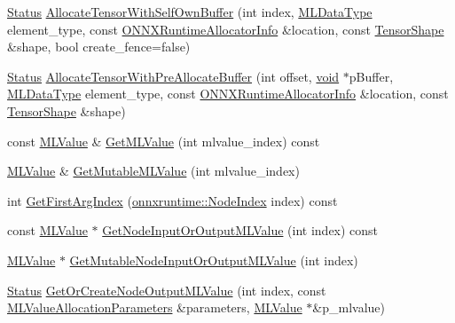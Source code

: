 \begin{DoxyCompactItemize}
\item 
\mbox{\hyperlink{classonnxruntime_1_1common_1_1Status}{Status}} \mbox{\hyperlink{classonnxruntime_1_1ExecutionFrame_a6ae368c852cfcf373900369c11b0ce02}{Allocate\+Tensor\+With\+Self\+Own\+Buffer}} (int index, \mbox{\hyperlink{namespaceonnxruntime_ad77d0a6e838ec7da5dc35fed5ee66b49}{M\+L\+Data\+Type}} element\+\_\+type, const \mbox{\hyperlink{structONNXRuntimeAllocatorInfo}{O\+N\+N\+X\+Runtime\+Allocator\+Info}} \&location, const \mbox{\hyperlink{classonnxruntime_1_1TensorShape}{Tensor\+Shape}} \&shape, bool create\+\_\+fence=false)
\item 
\mbox{\hyperlink{classonnxruntime_1_1common_1_1Status}{Status}} \mbox{\hyperlink{classonnxruntime_1_1ExecutionFrame_a6ab674e3c30323807a8d98ad5a293845}{Allocate\+Tensor\+With\+Pre\+Allocate\+Buffer}} (int offset, \mbox{\hyperlink{mlasi_8h_a88f941d423cb2a819b70a1358982b1a6}{void}} $\ast$p\+Buffer, \mbox{\hyperlink{namespaceonnxruntime_ad77d0a6e838ec7da5dc35fed5ee66b49}{M\+L\+Data\+Type}} element\+\_\+type, const \mbox{\hyperlink{structONNXRuntimeAllocatorInfo}{O\+N\+N\+X\+Runtime\+Allocator\+Info}} \&location, const \mbox{\hyperlink{classonnxruntime_1_1TensorShape}{Tensor\+Shape}} \&shape)
\item 
const \mbox{\hyperlink{classonnxruntime_1_1MLValue}{M\+L\+Value}} \& \mbox{\hyperlink{classonnxruntime_1_1ExecutionFrame_a1c8d41c9c63bd2f2d3756278a9c48804}{Get\+M\+L\+Value}} (int mlvalue\+\_\+index) const
\item 
\mbox{\hyperlink{classonnxruntime_1_1MLValue}{M\+L\+Value}} \& \mbox{\hyperlink{classonnxruntime_1_1ExecutionFrame_acf85178795ad4f8928a59d1a9d633969}{Get\+Mutable\+M\+L\+Value}} (int mlvalue\+\_\+index)
\item 
int \mbox{\hyperlink{classonnxruntime_1_1ExecutionFrame_a04a6774b853a170323aa5d44ccd9205d}{Get\+First\+Arg\+Index}} (\mbox{\hyperlink{namespaceonnxruntime_af8773b5c12b5d8fd9292eb2e268df760}{onnxruntime\+::\+Node\+Index}} index) const
\item 
const \mbox{\hyperlink{classonnxruntime_1_1MLValue}{M\+L\+Value}} $\ast$ \mbox{\hyperlink{classonnxruntime_1_1ExecutionFrame_a90468380156a27d66f6758cb93514e12}{Get\+Node\+Input\+Or\+Output\+M\+L\+Value}} (int index) const
\item 
\mbox{\hyperlink{classonnxruntime_1_1MLValue}{M\+L\+Value}} $\ast$ \mbox{\hyperlink{classonnxruntime_1_1ExecutionFrame_a5cba0e853c0cedd6da7c171ebd6321f1}{Get\+Mutable\+Node\+Input\+Or\+Output\+M\+L\+Value}} (int index)
\item 
\mbox{\hyperlink{classonnxruntime_1_1common_1_1Status}{Status}} \mbox{\hyperlink{classonnxruntime_1_1ExecutionFrame_ad2a0d87a9a924e9da843f8b3a7c8bfc0}{Get\+Or\+Create\+Node\+Output\+M\+L\+Value}} (int index, const \mbox{\hyperlink{structonnxruntime_1_1MLValueAllocationParameters}{M\+L\+Value\+Allocation\+Parameters}} \&parameters, \mbox{\hyperlink{classonnxruntime_1_1MLValue}{M\+L\+Value}} $\ast$\&p\+\_\+mlvalue)

\end{DoxyCompactItemize}
